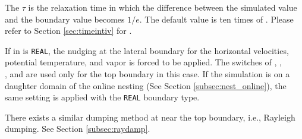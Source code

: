 The $\tau$ is the relaxation time in which the difference between the simulated value and the boundary value becomes $1/e$.
The default value is ten times of . 
Please refer to Section \ref{sec:timeintiv} for .


If  in  is \verb|REAL|, the nudging at the lateral boundary for the horizontal velocities, potential temperature, and vapor is forced to be applied.
The switches of , , \\
, and  are used only for the top boundary in this case.
If the simulation is on a daughter domain of the online nesting (See Section \ref{subsec:nest_online}), the same setting is applied with the \verb|REAL| boundary type.


There exists a similar dumping method at near the top boundary, i.e., Rayleigh dumping. See Section \ref{subsec:raydamp}.
